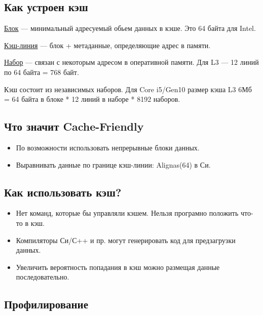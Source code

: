 \subsection{Как устроен кэш}

\begin{Def}
	\underline{Блок} --- минимальный адресуемый обьем данных в кэше. Это 64 байта для Intel.
\end{Def}

\begin{Def}
	\underline{Кэш-линия} --- блок + метаданные, определяющие адрес в памяти.
\end{Def}

\begin{Def}
	\underline{Набор} --- связан с некоторым адресом в оперативной памяти. Для L3 --- 12 
	линий по 64 байта = 768 байт.
\end{Def}

Кэш состоит из независимых наборов. Для Core i5/Gen10 размер кэша L3 6Мб = 64 байта в блоке *
12 линий в наборе * 8192 наборов.

\subsection{Что значит Cache-Friendly}

\begin{itemize}
	\item По возможности использовать непрерывные блоки данных.
	\item Выравнивать данные по границе кэш-линии: Alignas(64) в Си.
\end{itemize}

\subsection{Как использовать кэш?}

\begin{itemize}
	\item Нет команд, которые бы управляли кэшем. Нельзя програмно положить 
	что-то в кэш.
	\item Компиляторы Си/С++ и пр. могут генерировать код для предзагрузки данных.
	\item Увеличить вероятность попадания в кэш можно размещая данные последовательно.
\end{itemize}

\subsection{Профилирование}

